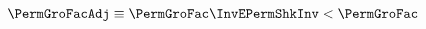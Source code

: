  \begin{align}
    \PermGroFacAdj & \equiv \PermGroFac \InvEPermShkInv < \PermGroFac \label{eq:PermGroFacAdj}
  \end{align}
